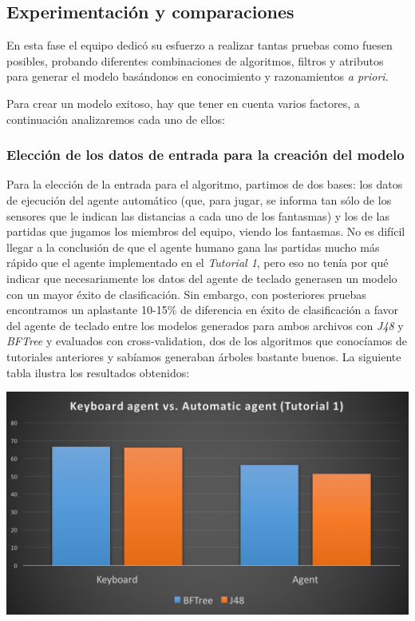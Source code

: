 \documentclass[12pt]{article}
\begin{document}
\newpage
\subsection{Experimentación y comparaciones}

En esta fase el equipo dedicó su esfuerzo a realizar tantas pruebas como fuesen posibles, probando diferentes combinaciones de algoritmos, filtros y atributos para generar el modelo basándonos en conocimiento y razonamientos \emph{a priori}.

\vspace{0.2cm}

Para crear un modelo exitoso, hay que tener en cuenta varios factores, a continuación analizaremos cada uno de ellos:

\subsubsection{Elección de los datos de entrada para la creación del modelo}

Para la elección de la entrada para el algoritmo, partimos de dos bases: los datos de ejecución del agente automático (que, para jugar, se informa tan sólo de los sensores que le indican las distancias a cada uno de los fantasmas) y los de las partidas que jugamos los miembros del equipo, viendo los fantasmas. No es difícil llegar a la conclusión de que el agente humano gana las partidas mucho más rápido que el agente implementado en el \emph{Tutorial 1}, pero eso no tenía por qué indicar que necesariamente los datos del agente de teclado generasen un modelo con un mayor éxito de clasificación. Sin embargo, con posteriores pruebas encontramos un aplastante 10-15\% de diferencia en éxito de clasificación a favor del agente de teclado entre los modelos generados para ambos archivos con \emph{J48} y \emph{BFTree} y evaluados con cross-validation, dos de los algoritmos que conocíamos de tutoriales anteriores y sabíamos generaban árboles bastante buenos. La siguiente tabla ilustra los resultados obtenidos:

\begin{center} \includegraphics[width=14cm]{kb_vs_aa} \end{center}
\end{document}
